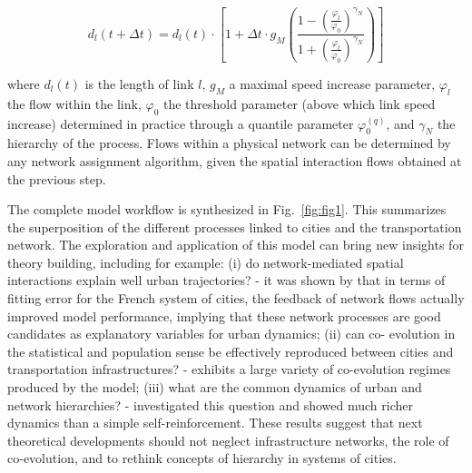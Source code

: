 \documentclass[10pt]{article}
\begin{document}
\begin{equation}
	d_l(t+ \Delta t) = d_l(t) \cdot \left[ 1 + \Delta t \cdot g_M \left( \frac{1 - \left(\frac{\varphi_l}{\varphi_0}\right)^{\gamma_N}}{1 + \left(\frac{\varphi_l}{\varphi_0}\right)^{\gamma_N}} \right) \right]	
\end{equation}

where $d_l(t)$ is the length of link $l$, $g_M$ a maximal speed increase parameter, $\varphi_l$ the flow within the link, $\varphi_0$ the threshold parameter (above which link speed increase) determined in practice through a quantile parameter $\varphi_0^{(q)}$, and $\gamma_N$ the hierarchy of the process. Flows within a physical network can be determined by any network assignment algorithm, given the spatial interaction flows obtained at the previous step.

The complete model workflow is synthesized in Fig.~\ref{fig:fig1}. This summarizes the superposition of the different processes linked to cities and the transportation network. The exploration and application of this model can bring new insights for theory building, including for example: (i) do network-mediated spatial interactions explain well urban trajectories? - it was shown by \citep{raimbault2020indirect} that in terms of fitting error for the French system of cities, the feedback of network flows actually improved model performance, implying that these network processes are good candidates as explanatory variables for urban dynamics; (ii) can co- evolution in the statistical and population sense be effectively reproduced between cities and transportation infrastructures? - \citep{raimbault2020modeling} exhibits a large variety of co-evolution regimes produced by the model; (iii) what are the common dynamics of urban and network hierarchies? - \citep{raimbault2020hierarchy} investigated this question and showed much richer dynamics than a simple self-reinforcement. These results suggest that next theoretical developments should not neglect infrastructure networks, the role of co-evolution, and to rethink concepts of hierarchy in systems of cities.
\end{document}
